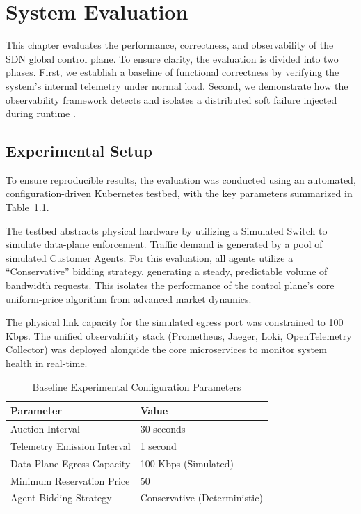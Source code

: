 
\chapter{System Evaluation}

This chapter evaluates the performance, correctness, and observability of the SDN global control plane. To ensure clarity, the evaluation is divided into two phases. First, we establish a baseline of functional correctness by verifying the system's internal telemetry under normal load. Second, we demonstrate how the observability framework detects and isolates a distributed soft failure injected during runtime \cite{sigelman2010dapper, jangJaegerOpenSourceDistributed2020, thompsonDesigningObservableDistributedSystems2022}.

\section{Experimental Setup}

To ensure reproducible results, the evaluation was conducted using an automated, configuration-driven Kubernetes testbed, with the key parameters summarized in Table~\ref{tab:experiment_params}. 

The testbed abstracts physical hardware by utilizing a Simulated Switch to simulate data-plane enforcement. Traffic demand is generated by a pool of simulated Customer Agents. For this evaluation, all agents utilize a ``Conservative'' bidding strategy, generating a steady, predictable volume of bandwidth requests. This isolates the performance of the control plane's core uniform-price algorithm from advanced market dynamics.

The physical link capacity for the simulated egress port was constrained to 100 Kbps. The unified observability stack (Prometheus, Jaeger, Loki, OpenTelemetry Collector) was deployed alongside the core microservices to monitor system health in real-time.

\begin{table}[H]
\centering
\caption{Baseline Experimental Configuration Parameters}
\label{tab:experiment_params}
\begin{tabular}{ll}
\toprule
\textbf{Parameter} & \textbf{Value} \\
\midrule
Auction Interval & 30 seconds \\
Telemetry Emission Interval & 1 second \\
Data Plane Egress Capacity & 100 Kbps (Simulated) \\
Minimum Reservation Price & 50 \\
Agent Bidding Strategy & Conservative (Deterministic) \\
\bottomrule
\end{tabular}
\end{table}

